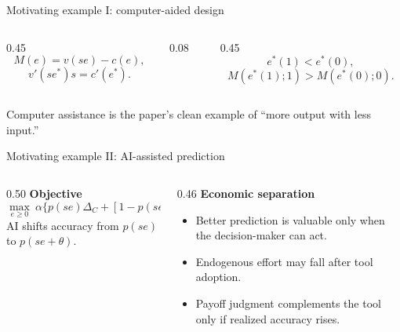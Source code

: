\documentclass[aspectratio=169,9pt]{beamer}
\begin{document}
\begin{frame}[t]{Motivating example I: computer-aided design}
  \vspace{0.50cm}
  \begin{columns}[T,onlytextwidth]
    \begin{column}{0.45\textwidth}
      \vspace{0.28cm}
      \[
        M(e)=v(se)-c(e),
      \]
      \[
        v'(se^*)s=c'(e^*).
      \]
    \end{column}
    \begin{column}{0.08\textwidth}
      \centering\vspace{1.4cm}{\color{AgRed}\Large$\Longrightarrow$}
    \end{column}
    \begin{column}{0.45\textwidth}
      \vspace{0.28cm}
      \[
        e^*(1)<e^*(0),
      \]
      \[
        M(e^*(1);1)>M(e^*(0);0).
      \]
    \end{column}
  \end{columns}
  \vfill
  {\small\color{AgMuted}Computer assistance is the paper's clean example of “more output with less input.”}
\end{frame}

\begin{frame}[t]{Motivating example II: AI-assisted prediction}
  \vspace{0.42cm}
  \vspace{0.34cm}
  \begin{columns}[T,onlytextwidth]
    \begin{column}{0.50\textwidth}
      \textbf{Objective}
      \[
        \max_{e\ge0}\ \alpha\{p(se)\Delta_{C}+[1-p(se)]\Delta_{W}\}-c(e).
      \]
      \small AI shifts accuracy from $p(se)$ to $p(se+\theta)$.
    \end{column}
    \begin{column}{0.46\textwidth}
      \textbf{Economic separation}
      \begin{itemize}\small
        \item Better prediction is valuable only when the decision-maker can act.
        \item Endogenous effort may fall after tool adoption.
        \item Payoff judgment complements the tool only if realized accuracy rises.
      \end{itemize}
    \end{column}
  \end{columns}
\end{frame}
\end{document}
